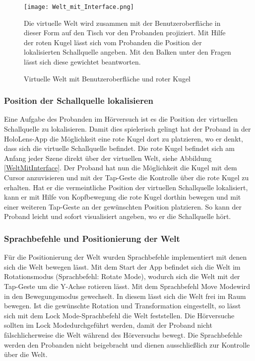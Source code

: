   \begin{figure}[H]
\centering
\texttt{[image: Welt\_mit\_Interface.png]}
\caption{Virtuelle Welt mit Benutzeroberfläche und roter Kugel}
Die virtuelle Welt wird zusammen mit der Benutzeroberfläche in dieser Form auf den Tisch vor den Probanden projiziert. Mit Hilfe der roten Kugel lässt sich vom Probanden die Position der lokalisierten Schallquelle angeben. Mit den Balken unter den Fragen lässt sich diese gewichtet beantworten. 
\label{fig:WeltMitInterface}
\end{figure} 
 \vspace*{10pt}
 
 \subsubsection{Position der Schallquelle lokalisieren}
 Eine Aufgabe des Probanden im Hörversuch ist es die Position der virtuellen Schallquelle zu lokalisieren. Damit dies spielerisch gelingt hat der Proband in der HoloLens-App die Möglichkeit eine rote Kugel dort zu platzieren, wo er denkt, dass sich die virtuelle Schallquelle befindet. Die rote Kugel befindet sich am Anfang jeder Szene direkt über der virtuellen Welt, siehe Abbildung \ref{WeltMitInterface}. Der Proband hat nun die Möglichkeit die Kugel mit dem Cursor anzuvisieren und mit der Tap-Geste die Kontrolle über die rote Kugel zu erhalten. Hat er die vermeintliche Position der virtuellen Schallquelle lokalisiert, kann er mit Hilfe von Kopfbewegung die rote Kugel dorthin bewegen und mit einer weiteren Tap-Geste an der gewünschten Position platzieren. So kann der Proband leicht und sofort visualisiert angeben, wo er die Schallquelle hört. 
 
 \subsubsection{Sprachbefehle und Positionierung der Welt}
 Für die Positionierung der Welt wurden Sprachbefehle implementiert mit denen sich die Welt bewegen lässt. Mit dem Start der App befindet sich die Welt im Rotationsmodus (Sprachbefehl: \glqq Rotate Mode\grqq), wodurch sich die Welt mit der Tap-Geste um die Y-Achse rotieren lässt. Mit dem Sprachbefehl \glqq Move Mode\grqq wird in den Bewegungsmodus gewechselt. In diesem lässt sich die Welt frei im Raum bewegen. Ist die gewünschte Rotation und Transformation eingestellt, so lässt sich mit dem \glqq Lock Mode\grqq -Sprachbefehl die Welt feststellen. Die Hörversuche sollten im \glqq Lock Mode\grqq durchgeführt werden, damit der Proband nicht fälschlicherweise die Welt während des Hörversuchs bewegt. Die Sprachbefehle werden den Probanden nicht beigebracht und dienen ausschließlich zur Kontrolle über die Welt.
  
